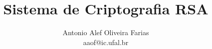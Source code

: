 \documentclass[12pt, a4paper]{article}
\begin{document}
\title{Sistema de Criptografia RSA}
\author{Antonio Alef Oliveira Farias \\ aaof@ic.ufal.br}

\maketitle
\end{document}
